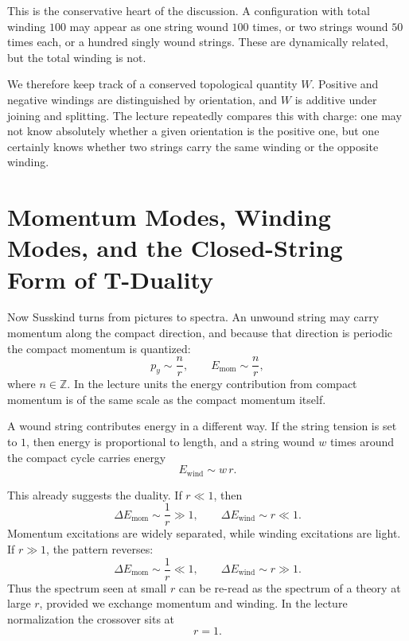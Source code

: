 This is the conservative heart of the discussion. A configuration with total winding \(100\) may appear as one string wound \(100\) times, or two strings wound \(50\) times each, or a hundred singly wound strings. These are dynamically related, but the total winding is not.

We therefore keep track of a conserved topological quantity \(W\). Positive and negative windings are distinguished by orientation, and \(W\) is additive under joining and splitting. The lecture repeatedly compares this with charge: one may not know absolutely whether a given orientation is the positive one, but one certainly knows whether two strings carry the same winding or the opposite winding.

\section{Momentum Modes, Winding Modes, and the Closed-String Form of T-Duality}

Now Susskind turns from pictures to spectra. An unwound string may carry momentum along the compact direction, and because that direction is periodic the compact momentum is quantized:
\begin{equation}
p_y \sim \frac{n}{r}, \qquad E_{\text{mom}} \sim \frac{n}{r},
\end{equation}
where \(n\in\mathbb{Z}\). In the lecture units the energy contribution from compact momentum is of the same scale as the compact momentum itself.

A wound string contributes energy in a different way. If the string tension is set to \(1\), then energy is proportional to length, and a string wound \(w\) times around the compact cycle carries energy
\begin{equation}
E_{\text{wind}} \sim w\,r.
\end{equation}

This already suggests the duality. If \(r\ll 1\), then
\begin{equation}
\Delta E_{\text{mom}} \sim \frac{1}{r} \gg 1, \qquad \Delta E_{\text{wind}} \sim r \ll 1.
\end{equation}
Momentum excitations are widely separated, while winding excitations are light. If \(r\gg 1\), the pattern reverses:
\begin{equation}
\Delta E_{\text{mom}} \sim \frac{1}{r} \ll 1, \qquad \Delta E_{\text{wind}} \sim r \gg 1.
\end{equation}
Thus the spectrum seen at small \(r\) can be re-read as the spectrum of a theory at large \(r\), provided we exchange momentum and winding. In the lecture normalization the crossover sits at
\begin{equation}
r=1.
\end{equation}


